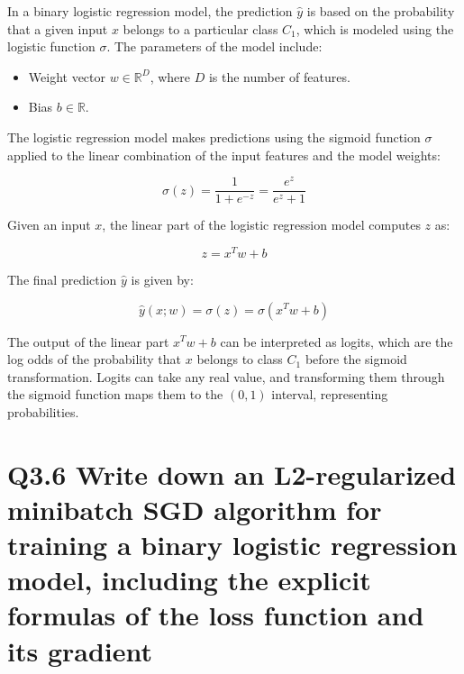 \documentclass[11pt]{article}
\begin{document}
In a binary logistic regression model, the prediction \( \hat{y} \) is based on the probability that a given input \( x \) belongs to a particular class \( C_1 \), which is modeled using the logistic function \( \sigma \). The parameters of the model include:

\begin{itemize}
    \item Weight vector \( w \in \mathbb{R}^D \), where \( D \) is the number of features.
    \item Bias \( b \in \mathbb{R} \).
\end{itemize}

The logistic regression model makes predictions using the sigmoid function \( \sigma \) applied to the linear combination of the input features and the model weights:

\[
\sigma(z) = \frac{1}{1 + e^{-z}} = \frac{e^z}{e^z + 1}
\]

Given an input \( x \), the linear part of the logistic regression model computes \( z \) as:

\[
z = x^T w + b
\]

The final prediction \( \hat{y} \) is given by:

\[
\hat{y}(x; w) = \sigma(z) = \sigma(x^T w + b)
\]

The output of the linear part \( x^T w + b \) can be interpreted as logits, which are the log odds of the probability that \( x \) belongs to class \( C_1 \) before the sigmoid transformation. Logits can take any real value, and transforming them through the sigmoid function maps them to the \((0, 1)\) interval, representing probabilities.

\section{Q3.6 Write down an L2-regularized minibatch SGD algorithm for training a binary logistic regression model, including the explicit formulas of the loss function and its gradient}
\end{document}
